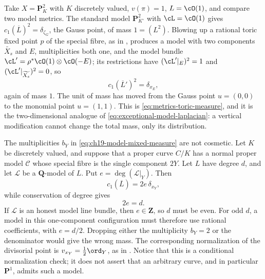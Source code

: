 \begin{example}
\label{ex:ch19-mass-migration}
Take $X=\mathbf P^2_K$ with $K$ discretely valued, $v(\pi)=1$,
$L=\cO(1)$, and compare two model metrics.  The standard model
$\mathbf P^2_{K^\circ}$ with $\cL=\cO(1)$ gives
$c_1(\overline L)^2=\delta_{\zeta_G}$, the Gauss point, of mass
$1=(L^2)$.  Blowing up a rational toric fixed point $p$ of the special fibre, as in
, produces a model with two components
$\widetilde{X_s}$ and $E$, multiplicities both one, and the model bundle
$\cL'=\rho^*\cO(1)\otimes\cO(-E)$; its restrictions have
$(\cL'|_E)^2=1$ and $(\cL'|_{\widetilde{X_s}})^2=0$, so
\[
 c_1(\overline L')^2=\delta_{x_E},
\]
again of mass $1$.  The unit of mass has moved from the Gauss point
$u=(0,0)$ to the monomial point $u=(1,1)$.  This is
\eqref{eq:metrics-toric-measure}, and it is the two-dimensional analogue of
\eqref{eq:exceptional-model-laplacian}: a vertical modification cannot change
the total mass, only its distribution.
\end{example}

\begin{example}
\label{ex:ch19-nonreduced}
The multiplicities $b_Y$ in \eqref{eq:ch19-model-mixed-measure} are not
cosmetic.  Let $K$ be discretely valued, and suppose that a proper curve
$C/K$ has a normal proper model $\mathcal C$ whose special fibre is the
single component $2Y$.  Let $L$ have degree $d$, and let
$\mathcal L$ be a $\mathbf Q$-model of $L$.  Put
$e=\deg(\mathcal L|_Y)$.  Then
\[
 c_1(\overline L)=2e\,\delta_{x_Y},
\]
while conservation of degree gives
\[
                         2e=d.
\]
If $\mathcal L$ is an honest model line bundle, then $e\in\mathbf Z$,
so $d$ must be even.  For odd $d$, a model in this one-component
configuration must therefore use rational coefficients, with
$e=d/2$.  Dropping either the multiplicity $b_Y=2$ or the denominator
would give the wrong mass.  The corresponding normalization of the
divisorial point is $v_{x_Y}=\tfrac12\ord_Y$, as in
.  Notice that this is a conditional
normalization check; it does not assert that an arbitrary curve, and in
particular $\mathbf P^1$, admits such a model.
\end{example}

